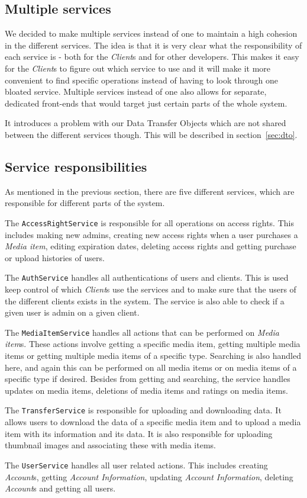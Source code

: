 \documentclass[../report.tex]{subfiles}
\begin{document}
\subsection{Multiple services}
We decided to make multiple services instead of one to maintain a high cohesion in the different services. The idea is that it is very clear what the responsibility of each service is - both for the \textit{Client}s and for other developers. This makes it easy for the \textit{Client}s to figure out which service to use and it will make it more convenient to find specific operations instead of having to look through one bloated service. Multiple services instead of one also allows for separate, dedicated front-ends that would target just certain parts of the whole system. 

It introduces a problem with our Data Transfer Objects which are not shared between the different services though. This will be described in section~\ref{sec:dto}.

\subsection{Service responsibilities}
As mentioned in the previous section, there are five different services, which are responsible for different parts of the system. 

The \texttt{AccessRightService} is responsible for all operations on access rights. This includes making new admins, creating new access rights when a user purchases a \textit{Media item}, editing expiration dates, deleting access rights and getting purchase or upload histories of users. 

The \texttt{AuthService} handles all authentications of users and clients. This is used keep control of which \textit{Client}s use the services and to make sure that the users of the different clients exists in the system. The service is also able to check if a given user is admin on a given client.

The \texttt{MediaItemService} handles all actions that can be performed on \textit{Media item}s. These actions involve getting a specific media item, getting multiple media items or getting multiple media items of a specific type. Searching is also handled here, and again this can be performed on all media items or on media items of a specific type if desired. Besides from getting and searching, the service handles updates on media items, deletions of media items and ratings on media items.

The \texttt{TransferService} is responsible for uploading and downloading data. It allows users to download the data of a specific media item and to upload a media item with its information and its data. It is also responsible for uploading thumbnail images and associating these with media items.

The \texttt{UserService} handles all user related actions. This includes creating \textit{Account}s, getting \textit{Account Information}, updating \textit{Account Information}, deleting \textit{Account}s and getting all users. 
\end{document}
